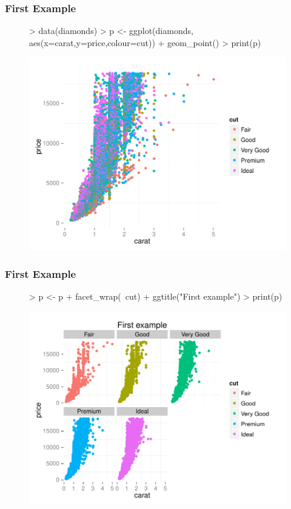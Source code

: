\documentclass[10pt,slidestop,mathserif,c]{beamer}
\begin{document}
\begin{frame}
	\frametitle{First Example}
\begin{figure}
\begin{Schunk}
\begin{Sinput}
> data(diamonds)
> p <- ggplot(diamonds, aes(x=carat,y=price,colour=cut)) + 
   	geom_point()
> print(p)
\end{Sinput}
\end{Schunk}
\includegraphics{Slides-ggplot-fig1}
\end{figure}
\end{frame}

\begin{frame}
	\frametitle{First Example}
\begin{figure}
\begin{Schunk}
\begin{Sinput}
> p <- p + facet_wrap(~cut) + 
   	ggtitle("First example")
> print(p)
\end{Sinput}
\end{Schunk}
\includegraphics{Slides-ggplot-fig2}
\end{figure}
\end{frame}
\end{document}

